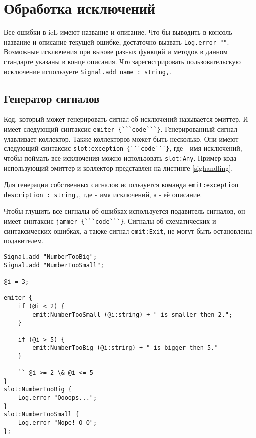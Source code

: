 \section{Обработка исключений}

Все ошибки в icL имеют название и описание. Что бы выводить в консоль название и описание текущей ошибке, достаточно вызвать \lstinline|Log.error ""|. Возможные исключения при вызове разных функций и методов в данном стандарте указаны в конце описания. Что зарегистрировать пользовательскую исключение используете \lstinline|Signal.add name : string,|.

\subsection{Генератор сигналов}

Код, который может генерировать сигнал об исключений называется эмиттер. И имеет следующий синтаксис \lstinline|emiter {```code```}|. Генерированный сигнал улавливает коллектор. Также коллекторов может быть несколько. Они имеют следующий синтаксис \lstinline|slot:exception {```code```}|,
где  - имя исключений, чтобы поймать все исключения можно использовать \lstinline|slot:Any|. Пример кода использующий эмиттер и коллектор представлен на листинге \ref{sighandling}.

Для генерации собственных сигналов используется команда \lstinline|emit:exception description : string,|, где  - имя исключений, а  - её описание.

Чтобы глушить все сигналы об ошибках используется подавитель сигналов, он имеет синтаксис \lstinline|jammer {```code```}|. Сигналы об схематических и синтаксических ошибках, а также сигнал \lstinline|emit:Exit|, не могут быть остановлены подавителем.

\begin{lstlisting}[caption=Обработка инключении, label=sighandling]
Signal.add "NumberTooBig";
Signal.add "NumberTooSmall";

@i = 3;

emiter {
	if (@i < 2) {
		emit:NumberTooSmall (@i:string) + " is smaller then 2.";
	}
	
	if (@i > 5) {
		emit:NumberTooBig (@i:string) + " is bigger then 5."
	}

	`` @i >= 2 \& @i <= 5
}
slot:NumberTooBig {
	Log.error "Oooops...";
}
slot:NumberTooSmall {
	Log.error "Nope! O_O";
};
\end{lstlisting}

